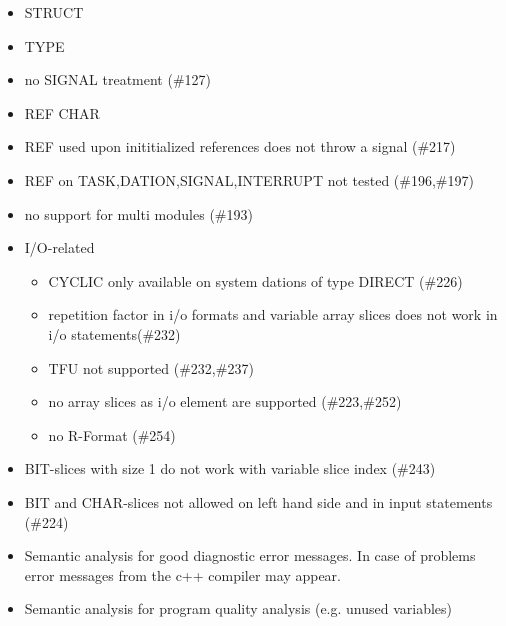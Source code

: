 \documentclass[oneside,10pt]{scrbook}
\begin{document}
\begin{itemize}
\item STRUCT
\item TYPE
\item no SIGNAL treatment (\#127)
\item REF CHAR
\item REF used upon inititialized references does not throw a signal (\#217)
\item REF on TASK,DATION,SIGNAL,INTERRUPT not tested (\#196,\#197)
\item no support for multi modules (\#193)
\item I/O-related
   \begin{itemize}
   \item CYCLIC only available on system dations of type DIRECT (\#226)
   \item repetition factor in i/o formats and variable array slices 
      does not work in i/o statements(\#232)
   \item TFU not supported (\#232,\#237)
   \item no array slices as i/o element are supported (\#223,\#252)
   \item no R-Format (\#254)
   \end{itemize}
\item BIT-slices with size 1 do not work with variable slice index (\#243)
\item BIT and CHAR-slices not allowed on left hand side and in input statements
    (\#224)

\item Semantic analysis for good diagnostic error messages.
     In case of problems error messages from the c++ compiler may appear. 
\item Semantic analysis for program quality analysis (e.g. unused variables)
\end{itemize}
\end{document}
